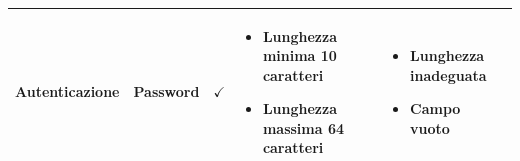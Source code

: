 \documentclass[12pt]{article}
\begin{document}
\begin{longtable}{|l|l|l|l|l|}
 \textbf{Autenticazione} & Password & $\checkmark$ & \begin{minipage}{3.5cm}
 \vspace{5pt}
 \begin{itemize}
 \item Lunghezza minima 10 caratteri
 \item Lunghezza massima 64 caratteri
 \end{itemize}
 \vspace{5pt}
 \end{minipage} & \begin{minipage}{4cm}
 \vspace{5pt}
 \begin{itemize}
 \item Lunghezza inadeguata
 \item Campo vuoto
 \end{itemize}
 \vspace{5pt}
 \end{minipage} \\ \hline
 
 \end{longtable}
 
\end{document}
